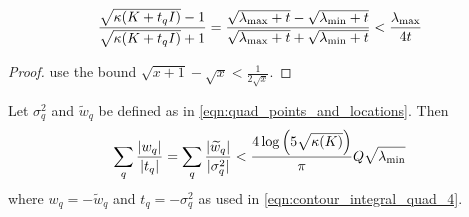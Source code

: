 \begin{lemma}
  \begin{align}
    \frac{
      \sqrt{\kappa(K + t_q I)} - 1
    }{
      \sqrt{\kappa(K + t_q I)} + 1
    } = \frac{\sqrt{\lambda_\text{max} + t} - \sqrt{\lambda_\text{min} + t}  }{\sqrt{\lambda_\text{max} + t} + \sqrt{\lambda_\text{min} + t}  }
    < \frac{\lambda_\text{max}}{4t}
  \end{align}
  \label{lemma:condition}
\end{lemma}
\begin{proof}
   use the bound $\sqrt{x+1} - \sqrt{x} < \frac{1}{2 \sqrt{x}}$.
\end{proof}




\begin{lemma}
  Let $\sigma_q^2$ and $\widetilde w_q$ be defined as in \cref{eqn:quad_points_and_locations}.
  Then
  \begin{equation*}
    \sum_q \frac{|w_q|}{|t_q|} = \sum_q \frac{|\widetilde w_q|}{|\sigma^2_q|} < \frac{4  \log \left( 5 \sqrt{\kappa(K)} \right)  }{\pi}Q\sqrt{\lambda_\text{min}} \\
  \end{equation*}
  where $w_q = -\widetilde w_q$ and $t_q = -\sigma^2_q$ as used in \cref{eqn:contour_integral_quad_4}.
  \label{lemma:quad_ratio}
\end{lemma}

